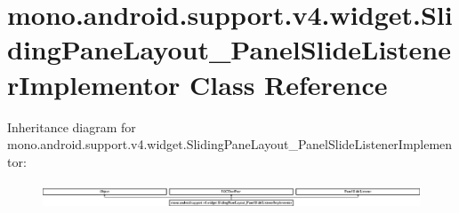 \hypertarget{classmono_1_1android_1_1support_1_1v4_1_1widget_1_1SlidingPaneLayout__PanelSlideListenerImplementor}{}\section{mono.\+android.\+support.\+v4.\+widget.\+Sliding\+Pane\+Layout\+\_\+\+Panel\+Slide\+Listener\+Implementor Class Reference}
\label{classmono_1_1android_1_1support_1_1v4_1_1widget_1_1SlidingPaneLayout__PanelSlideListenerImplementor}
Inheritance diagram for mono.\+android.\+support.\+v4.\+widget.\+Sliding\+Pane\+Layout\+\_\+\+Panel\+Slide\+Listener\+Implementor\+:\begin{figure}[H]
\begin{center}
\leavevmode
\includegraphics[height=0.763463cm]{classmono_1_1android_1_1support_1_1v4_1_1widget_1_1SlidingPaneLayout__PanelSlideListenerImplementor}
\end{center}
\end{figure}
